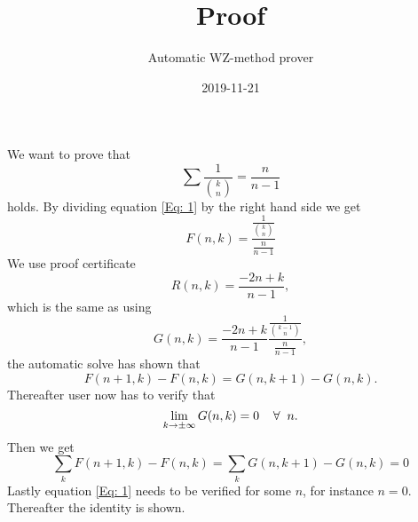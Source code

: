 \documentclass{article}
\title{Proof}
\author{Automatic WZ-method prover}
\date{2019-11-21}
\let\oldforall\forall
\renewcommand{\forall}{\hspace*{2mm}\oldforall\hspace*{1mm}}
\begin{document}
\maketitle
We want to prove that
\begin{equation}\label{Eq: 1}
\sum \frac{1}{\binom{k}{n}}=\frac{n}{n-1}
\end{equation}
holds. By dividing equation \ref{Eq: 1} by the right hand side we get
\begin{equation}
F(n,k)=\frac{\frac{1}{\binom{k}{n}}}{\frac{n}{n-1}}
\end{equation}
We use proof certificate
\begin{equation}
R(n,k)=\frac{-2n+k}{n-1},
\end{equation}
which is the same as using
\begin{equation}
G(n,k)=\frac{-2n+k}{n-1}\frac{\frac{1}{\binom{k-1}{n}}}{\frac{n}{n-1}},
\end{equation}
the automatic solve has  shown that
\begin{equation}\label{Eq: WZ1}
F(n+1,k)-F(n,k)=G(n,k+1)-G(n,k).
\end{equation}
Thereafter user now has to verify that
\begin{equation}
\lim_{k\to\pm\infty}G(n,k)=0\forall n.
\end{equation}
Then we get
\begin{equation}
\sum_k F(n+1,k)-F(n,k)=\sum_k G(n,k+1)-G(n,k)=0\end{equation}Lastly equation \ref{Eq: 1} needs to be verified for some $n$, for instance $n=0$. Thereafter the identity is shown.
\end{document}
